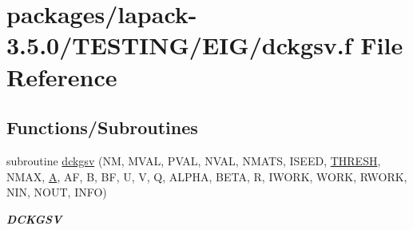 \hypertarget{dckgsv_8f}{}\section{packages/lapack-\/3.5.0/\+T\+E\+S\+T\+I\+N\+G/\+E\+I\+G/dckgsv.f File Reference}
\label{dckgsv_8f}
\subsection*{Functions/\+Subroutines}
\begin{DoxyCompactItemize}
\item 
subroutine \hyperlink{group__double__eig_gafbc45ea9306629ad531d876544d73adf}{dckgsv} (N\+M, M\+V\+A\+L, P\+V\+A\+L, N\+V\+A\+L, N\+M\+A\+T\+S, I\+S\+E\+E\+D, \hyperlink{zlaqgs_8c_a0656018abfc9fa2821827415f5d5ea57}{T\+H\+R\+E\+S\+H}, N\+M\+A\+X, \hyperlink{classA}{A}, A\+F, B, B\+F, U, V, Q, A\+L\+P\+H\+A, B\+E\+T\+A, R, I\+W\+O\+R\+K, W\+O\+R\+K, R\+W\+O\+R\+K, N\+I\+N, N\+O\+U\+T, I\+N\+F\+O)
\begin{DoxyCompactList}\small\item\em {\bfseries D\+C\+K\+G\+S\+V} \end{DoxyCompactList}\end{DoxyCompactItemize}
